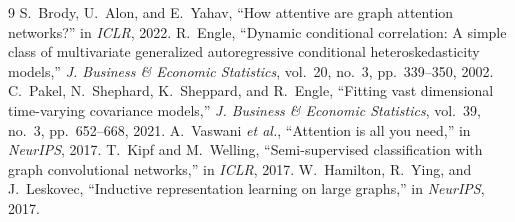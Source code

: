 \documentclass[conference]{IEEEtran}
\begin{document}
\begin{thebibliography}{9}
 S.~Brody, U.~Alon, and E.~Yahav, ``How attentive are graph attention networks?'' in \emph{ICLR}, 2022.
 R.~Engle, ``Dynamic conditional correlation: A simple class of multivariate generalized autoregressive conditional heteroskedasticity models,'' \emph{J. Business \& Economic Statistics}, vol.~20, no.~3, pp.~339--350, 2002.
 C.~Pakel, N.~Shephard, K.~Sheppard, and R.~Engle, ``Fitting vast dimensional time-varying covariance models,'' \emph{J. Business \& Economic Statistics}, vol.~39, no.~3, pp.~652--668, 2021.
 A.~Vaswani \emph{et al.}, ``Attention is all you need,'' in \emph{NeurIPS}, 2017.
 T.~Kipf and M.~Welling, ``Semi-supervised classification with graph convolutional networks,'' in \emph{ICLR}, 2017.
 W.~Hamilton, R.~Ying, and J.~Leskovec, ``Inductive representation learning on large graphs,'' in \emph{NeurIPS}, 2017.
\end{thebibliography}
\end{document}
